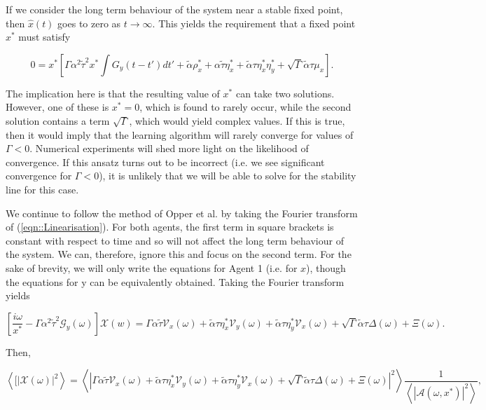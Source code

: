 \documentclass[.../main.tex]{subfiles}
\begin{document}
If we consider the long term behaviour of the system near a stable fixed point, then $\hat{x}(t)$ goes to zero as $t \rightarrow \infty$. This yields the requirement that a fixed point $x^*$ must satisfy


\begin{equation}
	0 = x^* \left[\Gamma \alpha^2 \tilde{\tau}^2 x^* \int G_y(t - t') dt' + \tilde{\alpha} \rho_x^* + \alpha \tilde{\tau} \eta_x^* + \tilde{\alpha} \tau \eta_x^* \eta_y^* + \sqrt{\Gamma} \tilde{\alpha} \tau \mu_x \right].
\end{equation}

The implication here is that the resulting value of $x^*$ can take two solutions. However, one of these is $x^* = 0$, which is found to rarely occur, while the second solution contains a term $\sqrt{\Gamma}$, which would yield complex values. If this is true, then it would imply that the learning algorithm will rarely converge for values of $\Gamma < 0$. Numerical experiments will shed more light on the likelihood of convergence. If this ansatz turns out to be incorrect (i.e. we see significant convergence for $\Gamma < 0$), it is unlikely that we will be able to solve for the stability line for this case.  

We continue to follow the method of Opper et al. by taking the Fourier transform of (\ref{eqn::Linearisation}). For both agents, the first term in square brackets is constant with respect to time and so will not affect the long term behaviour of the system. We can, therefore, ignore this and focus on the second term. For the sake of brevity, we will only write the equations for Agent 1 (i.e. for $x$), though the equations for y can be equivalently obtained. Taking the Fourier transform yields

\begin{equation}
	\left[ \frac{i \omega}{x^*} - \Gamma \alpha^2 \tilde{\tau}^2 \mathcal{G}_y(\omega)\right] \mathcal{X}(w) = \Gamma \alpha \tilde{\tau} \mathcal{V}_x(\omega) + \tilde{\alpha} \tau \eta^*_x \mathcal{V}_y(\omega) + \tilde{\alpha} \tau \eta^*_y \mathcal{V}_x(\omega) + \sqrt{\Gamma} \tilde{\alpha} \tau \Delta(\omega) + \Xi(\omega).
\end{equation} 

Then,

\begin{equation} \label{eqn::Transformed}
	\left<[|\mathcal{X}(\omega)|^2 \right> = \left< | \Gamma \alpha \tilde{\tau} \mathcal{V}_x(\omega) + \tilde{\alpha} \tau \eta^*_x \mathcal{V}_y(\omega) + \tilde{\alpha} \tau \eta^*_y \mathcal{V}_x(\omega) + \sqrt{\Gamma} \tilde{\alpha} \tau \Delta(\omega) + \Xi(\omega) |^2 \right> \frac{1}{\left< |\mathcal{A}(\omega, x^*) |^2 \right>}, 
\end{equation}
\end{document}
